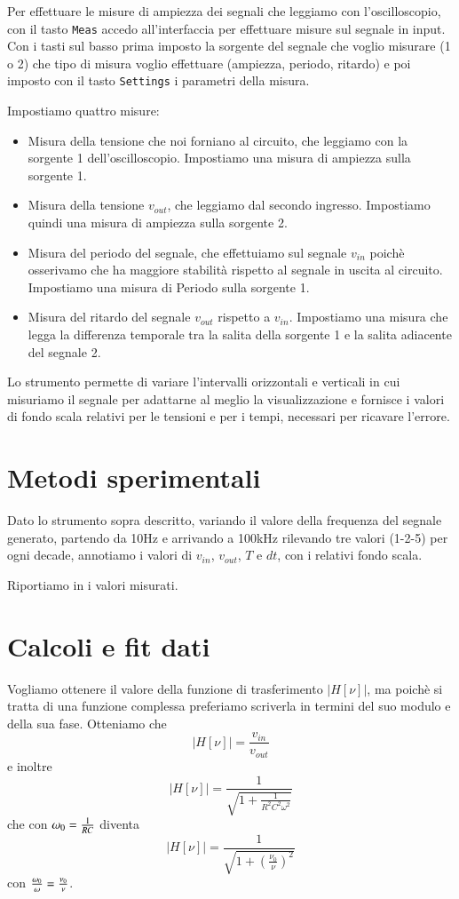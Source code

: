 \documentclass[
    rmp,
    reprint, 
    superscriptaddress, 
    altaffilletter, 
    amsmath, 
    amssymb, 
    a4paper]{revtex4-2}
\begin{document}
Per effettuare le misure di ampiezza dei segnali che leggiamo con l'oscilloscopio, con il tasto \verb|Meas| accedo all'interfaccia per effettuare misure sul segnale in input. Con i tasti sul basso prima imposto la sorgente del segnale che voglio misurare (1 o 2) che tipo di misura voglio effettuare (ampiezza, periodo, ritardo) e poi imposto con il tasto \verb|Settings| i parametri della misura. 

Impostiamo quattro misure:
\begin{itemize}
    \item Misura della tensione che noi forniano al circuito, che leggiamo con la sorgente 1 dell'oscilloscopio. Impostiamo una misura di ampiezza sulla sorgente 1.
    \item Misura della tensione $v_{out}$, che leggiamo dal secondo ingresso. Impostiamo quindi una misura di ampiezza sulla sorgente 2.
    \item Misura del periodo del segnale, che effettuiamo sul segnale $v_{in}$ poichè osserivamo che ha maggiore stabilità rispetto al segnale in uscita al circuito. Impostiamo una misura di Periodo sulla sorgente 1.
    \item Misura del ritardo del segnale $v_{out}$ rispetto a $v_{in}$. Impostiamo una misura che legga la differenza temporale tra la salita della sorgente 1 e la salita adiacente del segnale 2. 
\end{itemize}

Lo strumento permette di variare l'intervalli orizzontali e verticali in cui misuriamo il segnale per adattarne al meglio la visualizzazione e fornisce i valori di fondo scala relativi per le tensioni e per i tempi, necessari per ricavare l'errore.

\section{Metodi sperimentali}

Dato lo strumento sopra descritto, variando il valore della frequenza del segnale generato, partendo da 10Hz e arrivando a 100kHz rilevando tre valori (1-2-5) per ogni decade, annotiamo i valori di $v_{in}$, $v_{out}$, $T$ e $dt$, con i relativi fondo scala. 

Riportiamo in  i valori misurati. 

\section{Calcoli e fit dati}

Vogliamo ottenere il valore della funzione di trasferimento $\left|H[\nu]\right|$, ma poichè si tratta di una funzione complessa preferiamo scriverla in termini del suo modulo e della sua fase. Otteniamo che \[\left|H[\nu]\right|=\frac{v_{in}}{v_{out}}\] e inoltre \[\left|H[\nu]\right|=\frac{1}{\sqrt{1+\frac{1}{R^2 C^2 \omega^2}}}\] che con $\omega_0={1\over{RC}}$ diventa \begin{equation}\left|H[\nu]\right|=\frac{1}{\sqrt{1+\left(\frac{\nu_0}{\nu}\right)^2}} \label{eqn:H}\end{equation} con ${\omega_0\over\omega} = {\nu_0\over\nu}$.
\end{document}
